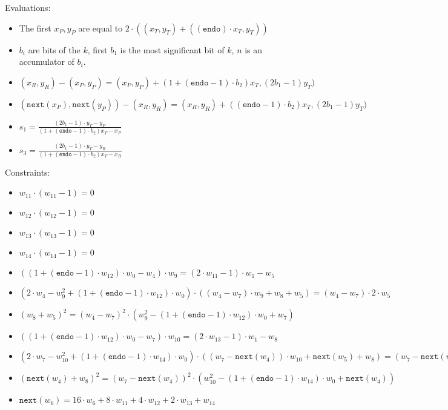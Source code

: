 Evaluations:
\begin{itemize}
	\item The first $x_P, y_P$ are equal to $2 \cdot ((x_T, y_T) + ((\texttt{endo}) \cdot x_T, y_T))$
	\item $b_i$ are bits of the $k$, first $b_1$ is the most significant bit of $k$, $n$ is an accumulator of $b_i$.
	\item $(x_R, y_R) - (x_P, y_P) = (x_P, y_P) + (1 + (\texttt{endo} - 1) \cdot b_2) x_T, (2b_1 - 1)y_T)$
	\item $(\texttt{next}(x_P), \texttt{next}(y_P)) - (x_R, y_R) = (x_R, y_R) + ((\texttt{endo} - 1) \cdot b_2) x_T, (2b_1 - 1)y_T)$
	\item $s_1 = \frac{(2b_1 - 1) \cdot y_T - y_P}{(1 + (\texttt{endo} - 1) \cdot b_2) x_T - x_P}$
	\item $s_3 = \frac{(2b_1 - 1) \cdot y_T - y_R}{(1 + (\texttt{endo} - 1) \cdot b_2) x_T - x_R}$

\end{itemize}

Constraints:
\begin{itemize}
    \item $w_{11} \cdot (w_{11} - 1) = 0$
    \item $w_{12} \cdot (w_{12} - 1) = 0$
    \item $w_{13} \cdot (w_{13} - 1) = 0$
    \item $w_{14} \cdot (w_{14} - 1) = 0$
    \item $((1 + (\texttt{endo} - 1) \cdot w_{12}) \cdot w_{0} - w_{4}) \cdot w_{9} = (2 \cdot w_{11} - 1) \cdot w_{1} - w_{5}$
    \item $(2 \cdot w_{4} - w_{9}^2 + (1 + (\texttt{endo} - 1) \cdot w_{12}) \cdot w_{0}) \cdot ((w_{4} - w_{7}) \cdot w_{9} + w_{8} + w_{5}) = (w_{4} - w_{7}) \cdot 2 \cdot w_{5}$
    \item $(w_{8} + w_{5})^2 = (w_{4} - w_{7})^2 \cdot (w_{9}^2 - (1 + (\texttt{endo} - 1) \cdot w_{12}) \cdot w_{0} + w_{7})$
    \item $((1 + (\texttt{endo} - 1) \cdot w_{12}) \cdot w_{0} - w_{7}) \cdot w_{10} = (2 \cdot w_{13}-1) \cdot w_{1} - w_{8}$
    \item $(2 \cdot w_{7} - w_{10}^2 + (1 + (\texttt{endo} - 1) \cdot w_{14}) \cdot w_{0}) \cdot ((w_{7} - \texttt{next}(w_{4})) \cdot w_{10} + \texttt{next}(w_{5}) + w_{8}) = (w_{7} - \texttt{next}(w_{4})) \cdot 2 \cdot w_{8}$
    \item $(\texttt{next}(w_{4}) + w_{8})^2 = (w_{7} - \texttt{next}(w_{4}))^2 \cdot (w_{10}^2 - (1 + (\texttt{endo} - 1) \cdot w_{14}) \cdot w_{0} + \texttt{next}(w_{4}))$
    \item $\texttt{next}(w_{6}) = 16 \cdot w_{6} + 8 \cdot w_{11} + 4 \cdot w_{12} + 2 \cdot w_{13} + w_{14}$
\end{itemize}

